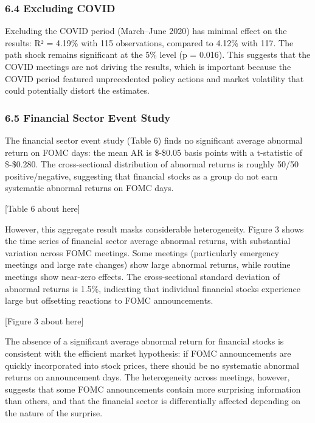 \documentclass[12pt]{article}
\begin{document}
\subsubsection{6.4 Excluding COVID}\label{excluding-covid}

Excluding the COVID period (March--June 2020) has minimal effect on the
results: R² = 4.19\% with 115 observations, compared to 4.12\% with 117.
The path shock remains significant at the 5\% level (p = 0.016). This
suggests that the COVID meetings are not driving the results, which is
important because the COVID period featured unprecedented policy actions
and market volatility that could potentially distort the estimates.

\subsubsection{6.5 Financial Sector Event
Study}\label{financial-sector-event-study}

The financial sector event study (Table 6) finds no significant average
abnormal return on FOMC days: the mean AR is \$-\$0.05 basis points with
a t-statistic of \$-\$0.280. The cross-sectional distribution of
abnormal returns is roughly 50/50 positive/negative, suggesting that
financial stocks as a group do not earn systematic abnormal returns on
FOMC days.

{[}Table 6 about here{]}

However, this aggregate result masks considerable heterogeneity. Figure
3 shows the time series of financial sector average abnormal returns,
with substantial variation across FOMC meetings. Some meetings
(particularly emergency meetings and large rate changes) show large
abnormal returns, while routine meetings show near-zero effects. The
cross-sectional standard deviation of abnormal returns is 1.5\%,
indicating that individual financial stocks experience large but
offsetting reactions to FOMC announcements.

{[}Figure 3 about here{]}

The absence of a significant average abnormal return for financial
stocks is consistent with the efficient market hypothesis: if FOMC
announcements are quickly incorporated into stock prices, there should
be no systematic abnormal returns on announcement days. The
heterogeneity across meetings, however, suggests that some FOMC
announcements contain more surprising information than others, and that
the financial sector is differentially affected depending on the nature
of the surprise.
\end{document}
